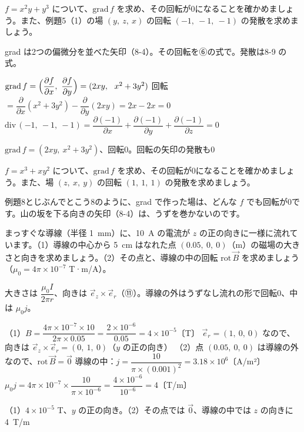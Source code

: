 \begin{reidai}[$\mathrm{rot}\,(\mathrm{grad}\,f)=\vec0$ を確かめる]
$f=x^2y+y^3$ について、$\mathrm{grad}\,f$ を求め、その回転が0になることを確かめましょう。また、例題5（1）の場 $(y,\ z,\ x)$ の回転 $(-1,\ -1,\ -1)$ の発散を求めましょう。\par
\kangaekata grad は2つの偏微分を並べた矢印（8-4）。その回転を⑥の式で。発散は8-9 の式。\par
\shiki $\mathrm{grad}\,f=\Bigl(\dfrac{\partial f}{\partial x},\ \dfrac{\partial f}{\partial y}\Bigr)=(2xy,\ \ x^2+3y^2)$\kviiikq
回転 $=\dfrac{\partial}{\partial x}(x^2+3y^2)-\dfrac{\partial}{\partial y}(2xy)=2x-2x=0$\kviiikq
$\mathrm{div}\,(-1,\ -1,\ -1)=\dfrac{\partial(-1)}{\partial x}+\dfrac{\partial(-1)}{\partial y}+\dfrac{\partial(-1)}{\partial z}=0$\par
\kotae $\mathrm{grad}\,f=(2xy,\ x^2+3y^2)$、回転0。回転の矢印の発散も0
\end{reidai}

\begin{jibun}
$f=x^3+xy^2$ について、$\mathrm{grad}\,f$ を求め、その回転が0になることを確かめましょう。また、場 $(z,\ x,\ y)$ の回転 $(1,\ 1,\ 1)$ の発散を求めましょう。
\end{jibun}

例題8とじぶんでとこう8のように、grad で作った場は、どんな $f$ でも回転が0です。山の坂を下る向きの矢印（8-4）は、うずを巻かないのです。

\begin{reidai}
まっすぐな導線（半径 \qty{1}{mm}）に、\qty{10}{A} の電流が $z$ の正の向きに一様に流れています。（1）導線の中心から \qty{5}{cm} はなれた点 $(0.05,\ 0,\ 0)$（m）の磁場の大きさと向きを求めましょう。（2）その点と、導線の中の回転 $\mathrm{rot}\,\vec B$ を求めましょう（$\mu_0=4\pi\times10^{-7}$ T·m/A）。\par
\kangaekata 大きさは $\dfrac{\mu_0I}{2\pi r}$、向きは $\vec e_z\times\vec e_r$（⑪）。導線の外はうずなし流れの形で回転0、中は $\mu_0j$。\par
\shiki（1）$B=\dfrac{4\pi\times10^{-7}\times10}{2\pi\times0.05}=\dfrac{2\times10^{-6}}{0.05}=4\times10^{-5}$〔T〕\kviiikq
$\vec e_r=(1,\ 0,\ 0)$ なので、向きは $\vec e_z\times\vec e_r=(0,\ 1,\ 0)$（$y$ の正の向き）\kviiikq
（2）点 $(0.05,\ 0,\ 0)$ は導線の外なので、$\mathrm{rot}\,\vec B=\vec0$\kviiikq
導線の中：$j=\dfrac{10}{\pi\times(0.001)^2}=3.18\times10^{6}$〔A/m²〕\kviiikq
$\mu_0j=4\pi\times10^{-7}\times\dfrac{10}{\pi\times10^{-6}}=\dfrac{4\times10^{-6}}{10^{-6}}=4$〔T/m〕\par
\kotae（1）\nobreak $4\times10^{-5}$ T、$y$ の正の向き。（2）\nobreak その点では $\vec0$、導線の中では $z$ の向きに \qty{4}{T/m}
\end{reidai}

